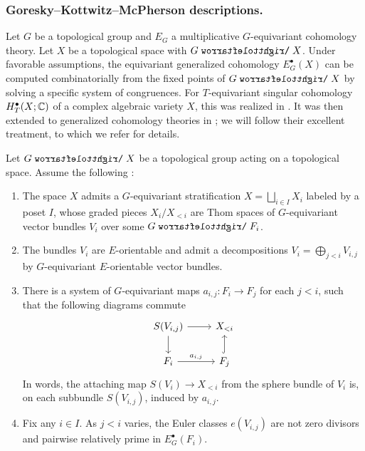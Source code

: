 \subsubsection{Goresky--Kottwitz--McPherson descriptions.}\label{section: GKM descriptions}


Let $G$ be a topological group and $E_G$ a multiplicative $G$-equivariant cohomology theory. Let $X$ be a topological space with $G \acts X$. Under favorable assumptions, the equivariant generalized cohomology $E^{\bullet}_G(X)$ can be computed combinatorially from the fixed points of $G \acts X$ by solving a specific system of congruences. For $T$-equivariant singular cohomology $H^{\bullet}_T(X; \operatorname{\mathbb{C}})$ of a complex algebraic variety $X$, this was realized in \cite[\S 7]{GKM97}. It was then extended to generalized cohomology theories in \cite{HHH05}; we will follow their excellent treatment, to which we refer for details.
\begin{assumption}\label{assumption: HHH assumptions}
Let $G \acts X$ be a topological group acting on a topological space. Assume the following \cite[\S 3, Assumptions 1-4]{HHH05}:
\begin{enumerate}
    \item The space $X$ admits a $G$-equivariant stratification $X = \bigsqcup_{i \in I} X_i$ labeled by a poset $I$, whose graded pieces $X_i / X_{<i}$ are Thom spaces of $G$-equivariant vector bundles $V_i$ over some $G \acts F_i$.
    \item The bundles $V_i$ are $E$-orientable and admit a decompositions $V_i = \bigoplus_{j < i} V_{i, j}$ by $G$-equivariant $E$-orientable vector bundles.
    \item There is a system of $G$-equivariant maps $a_{i, j}: F_i \to F_j$ for each $j < i$, such that the following diagrams commute
    \begin{equation*}
    \begin{tikzcd}
        S(V_{i, j}) \arrow[r] \arrow[d] & X_{<i} \\
        F_i \arrow[r, "a_{i, j}"] & F_j \arrow[u, hook]
    \end{tikzcd}
    \end{equation*}
    In words, the attaching map $S(V_i) \to X_{<i}$ from the sphere bundle of $V_i$ is, on each subbundle $S(V_{i, j})$, induced by $a_{i, j}$.
    \item Fix any $i \in I$. As $j<i$ varies, the Euler classes $e(V_{i, j})$ are not zero divisors and pairwise relatively prime in $E^{\bullet}_G(F_i)$.
\end{enumerate}
\end{assumption}

